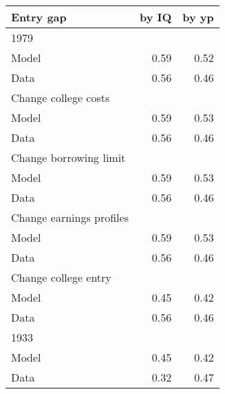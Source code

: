 \begin{tabular}{lrr}
\hline
Entry gap & by IQ  & by yp  \\ 
\hline
1979 &   &   \\ 
Model & 0.59  & 0.52  \\ 
Data & 0.56  & 0.46  \\ 
Change college costs &   &   \\ 
Model & 0.59  & 0.53  \\ 
Data & 0.56  & 0.46  \\ 
Change borrowing limit &   &   \\ 
Model & 0.59  & 0.53  \\ 
Data & 0.56  & 0.46  \\ 
Change earnings profiles &   &   \\ 
Model & 0.59  & 0.53  \\ 
Data & 0.56  & 0.46  \\ 
Change college entry &   &   \\ 
Model & 0.45  & 0.42  \\ 
Data & 0.56  & 0.46  \\ 
1933 &   &   \\ 
Model & 0.45  & 0.42  \\ 
Data & 0.32  & 0.47  \\ 
\hline
\end{tabular}%
